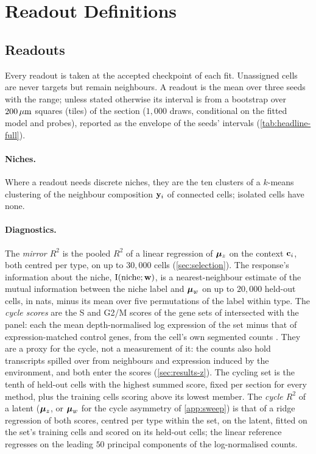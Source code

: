 \section{Readout Definitions}
\label{app:readouts-section}
\subsection{Readouts}
\label{app:readouts}

Every readout is taken at the accepted checkpoint of each fit. Unassigned cells are never targets but remain neighbours. A readout is the mean over three seeds with the range; unless stated otherwise its interval is from a bootstrap over $200\,\mu\text{m}$ squares (tiles) of the section ($1{,}000$ draws, conditional on the fitted model and probes), reported as the envelope of the seeds' intervals (\cref{tab:headline-full}).


\paragraph{Niches.} Where a readout needs discrete niches, they are the ten clusters of a $k$-means clustering of the neighbour composition $\mathbf{y}_i$ of connected cells; isolated cells have none.

\paragraph{Diagnostics.} The \emph{mirror $R^2$} is the pooled $R^2$ of a linear regression of $\boldsymbol{\mu}_z$ on the context $\mathbf{c}_i$, both centred per type, on up to $30{,}000$ cells (\cref{sec:selection}). The response's information about the niche, $\operatorname{I}(\text{niche}; \mathbf{w})$, is a nearest-neighbour estimate \citep{ross2014} of the mutual information between the niche label and $\boldsymbol{\mu}_w$ on up to $20{,}000$ held-out cells, in nats, minus its mean over five permutations of the label within type. The \emph{cycle scores} are the S and G2/M scores of the gene sets of \citet{tirosh2016} intersected with the panel: each the mean depth-normalised log expression of the set minus that of expression-matched control genes, from the cell's own segmented counts \citep{wolf2018}. They are a proxy for the cycle, not a measurement of it: the counts also hold transcripts spilled over from neighbours and expression induced by the environment, and both enter the scores (\cref{sec:results-z}). The cycling set is the tenth of held-out cells with the highest summed score, fixed per section for every method, plus the training cells scoring above its lowest member. The \emph{cycle $R^2$} of a latent ($\boldsymbol{\mu}_z$, or $\boldsymbol{\mu}_w$ for the cycle asymmetry of \cref{app:sweep}) is that of a ridge regression of both scores, centred per type within the set, on the latent, fitted on the set's training cells and scored on its held-out cells; the linear reference regresses on the leading $50$ principal components of the log-normalised counts.

